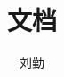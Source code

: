 \documentclass[12pt]{amsart}
\begin{document}
\title{文档}
\author{刘勤}
\address{上海交通大学 08级ACM班}
\maketitle

\end{document}
